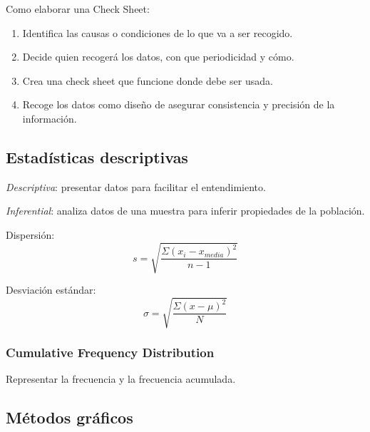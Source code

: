 \documentclass[]{article}
\begin{document}
Como elaborar una Check Sheet:

\begin{enumerate}
	\item Identifica las causas o condiciones de lo que va a ser recogido.
	\item Decide quien recogerá los datos, con que periodicidad y cómo.
	\item Crea una check sheet que funcione donde debe ser usada.
	\item Recoge los datos como diseño de asegurar consistencia y precisión de la información.
\end{enumerate}

\subsection{Estadísticas descriptivas}

\textit{Descriptiva}: presentar datos para facilitar el entendimiento.

\textit{Inferential}: analiza datos de una muestra para inferir propiedades de la población. 

Dispersión: 
\begin{equation}
s = \sqrt{\frac{\Sigma(x_i-x_{media})^2}{n-1}}
\end{equation}

Desviación estándar:
\begin{equation}
\sigma = \sqrt{\frac{\Sigma(x-\mu)^2}{N}}
\end{equation}

\subsubsection{Cumulative Frequency Distribution}

Representar la frecuencia y la frecuencia acumulada.

\subsection{Métodos gráficos}
\end{document}
